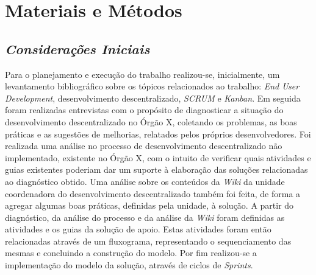 \chapter[Materiais e Métodos]{Materiais e Métodos}

\section{\textit{Considerações Iniciais}}

Para o planejamento e execução do trabalho realizou-se, inicialmente, um levantamento bibliográfico sobre os tópicos relacionados ao trabalho: \textit{End User Development}, desenvolvimento descentralizado, \textit{SCRUM} e \textit{Kanban}. Em seguida foram realizadas entrevistas com o propósito de diagnosticar a situação do desenvolvimento descentralizado no Órgão X, coletando os problemas, as boas práticas e as sugestões de melhorias, relatados pelos próprios desenvolvedores. Foi realizada uma análise no processo de desenvolvimento descentralizado não implementado, existente no Órgão X, com o intuito de verificar quais atividades e guias existentes poderiam dar um suporte à elaboração das soluções relacionadas ao diagnóstico obtido. Uma análise sobre os conteúdos da \textit{Wiki} da unidade coordenadora do desenvolvimento descentralizado também foi feita, de forma a agregar algumas boas práticas, definidas pela unidade, à solução. A partir do diagnóstico, da análise do processo e da análise da \textit{Wiki} foram definidas as atividades e os guias da solução de apoio. Estas atividades foram então relacionadas através de um fluxograma, representando o sequenciamento das mesmas e concluindo a construção do modelo. Por fim realizou-se a implementação do modelo da solução, através de ciclos de \textit{Sprints}.


